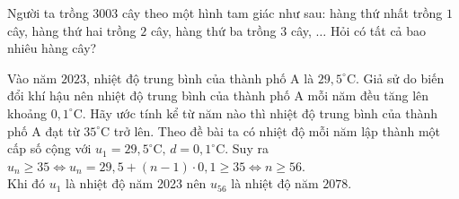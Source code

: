\begin{bt}%
	Người ta trồng $3003$ cây theo một hình tam giác như sau: hàng thứ nhất trồng $1$ cây, hàng thứ hai trồng $2$ cây, hàng thứ ba trồng $3$ cây, $\ldots$ Hỏi có tất cả bao nhiêu hàng cây?\par
\end{bt}

\begin{bt}%
    Vào năm $2023$, nhiệt độ trung bình của thành phố $\mathrm{A}$ là $29{,}5^{\circ} \mathrm{C}$. Giả sử do biến đổi khí hậu nên nhiệt độ trung bình của thành phố $\mathrm{A}$ mỗi năm đều tăng lên khoảng $0{,}1^{\circ} \mathrm{C}$. Hãy ước tính kể từ năm nào thì nhiệt độ trung bình của thành phố $\mathrm{A}$ đạt từ $35^{\circ} \mathrm{C}$ trở lên.
    \loigiai
    { Theo đề bài ta có nhiệt độ mỗi năm lập thành một cấp số cộng với  $u_1=29{,}5^\circ \mathrm{C},\, d=0{,}1^\circ \mathrm{C}$.
        Suy ra
        $u_n \geq 35 \Leftrightarrow u_n=29{,}5+(n-1) \cdot 0{,}1 \geq 35
        \Leftrightarrow n \geq 56$.\\
        Khi đó $u_1$ là nhiệt độ năm 2023 nên $u_{56}$ là nhiệt độ năm $2078$.
    }
\end{bt}

